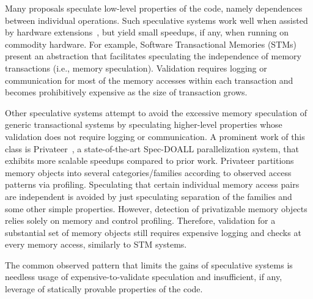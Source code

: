 Many proposals speculate low-level properties of the code, namely dependences
between individual operations.
%
Such speculative systems work well when assisted by hardware
extensions~\cite{TLS papers...}, but yield small speedups, if any, when running
on commodity hardware.
For example, Software Transactional Memories (STMs)~\cite{stmlite, ..} present
an abstraction that facilitates speculating the independence of memory
transactions (i.e., memory speculation). Validation requires logging or
communication for most of the memory accesses within each transaction and
becomes prohibitively expensive as the size of transaction grows.
%

Other speculative systems attempt to avoid the excessive memory speculation of
generic transactional systems by speculating higher-level properties whose
validation does not require logging or communication.
%
A prominent work of this class is Privateer~\cite{johnson:12:pldi:short}, a
state-of-the-art Spec-DOALL parallelization system, that exhibits more scalable
speedups compared to prior work.
%
Privateer partitions memory objects into several categories/families according
to observed access patterns via profiling.  Speculating that certain
individual memory access pairs are independent is avoided by just speculating
separation of the families and some other simple properties.  However, detection
of privatizable memory objects relies solely on memory and control profiling.
Therefore, validation for a substantial set of memory objects still requires
expensive logging and checks at every memory access, similarly to STM systems.
%

The common observed pattern that limits the gains of speculative systems is
needless usage of expensive-to-validate speculation and insufficient, if any,
leverage of statically provable properties of the code.

